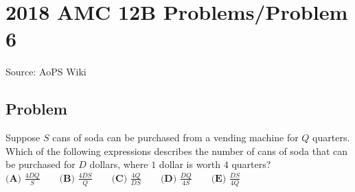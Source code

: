 \documentclass[12pt]{article}
\begin{document}
\section*{{2018 AMC 12B Problems/Problem 6}}
Source: AoPS Wiki

\subsection*{Problem}
Suppose $S$ cans of soda can be purchased from a vending machine for $Q$ quarters. Which of the following expressions describes the number of cans of soda that can be purchased for $D$ dollars, where $1$ dollar is worth $4$ quarters? $\textbf{(A) } \frac{4DQ}{S} \qquad \textbf{(B) } \frac{4DS}{Q} \qquad \textbf{(C) } \frac{4Q}{DS} \qquad \textbf{(D) } \frac{DQ}{4S} \qquad \textbf{(E) } \frac{DS}{4Q}$
\end{document}

